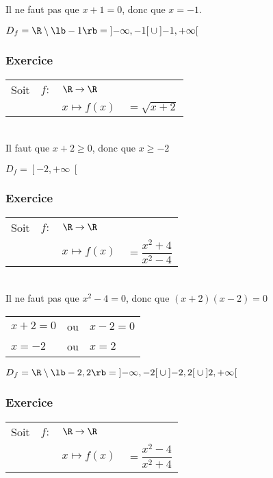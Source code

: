 Il ne faut pas que $x+1=0$, donc que $x=-1$.

$D_f = \R \setminus \lb -1 \rb = \left]-\infty,-1\right[\cup\left]-1, +\infty\right[$

\subsubsection{Exercice }

\begin{tabular}{llll}

Soit & $f:$& $ \R \rightarrow \R$ & \\
& & $x\mapsto f(x)$ & $=\sqrt{x+2}$ \\
\end{tabular}\\

Il faut que $x+2 \geqslant 0$, donc que $x \geqslant -2 $

$D_f = \left[-2, +\infty\right[ $

\newpage

\subsubsection{Exercice }

\begin{tabular}{llll}

Soit & $f:$& $ \R \rightarrow \R$ & \\
& & $x\mapsto f(x)$ & $=\dfrac{x^2 + 4}{x^2 - 4}$ \\
\end{tabular}\\

Il ne faut pas que $x^2 - 4 = 0$, donc que $\left(x+2\right)\left(x-2\right) = 0 $

\begin{tabular}{lll}
$x+2=0$ & ou & $x-2 = 0 $ \\
$x = -2 $ & ou & $x=2$ \\
\end{tabular}

$ D_f = \R \setminus\lb -2,2\rb = \left]-\infty, -2\right[\cup \left]-2,2\right[\cup\left]2, +\infty\right[ $

\subsubsection{Exercice }

\begin{tabular}{llll}

Soit & $f:$& $ \R \rightarrow \R$ & \\
& & $x\mapsto f(x)$ & $=\dfrac{x^2 - 4}{x^2 + 4}$ \\
\end{tabular}\\

